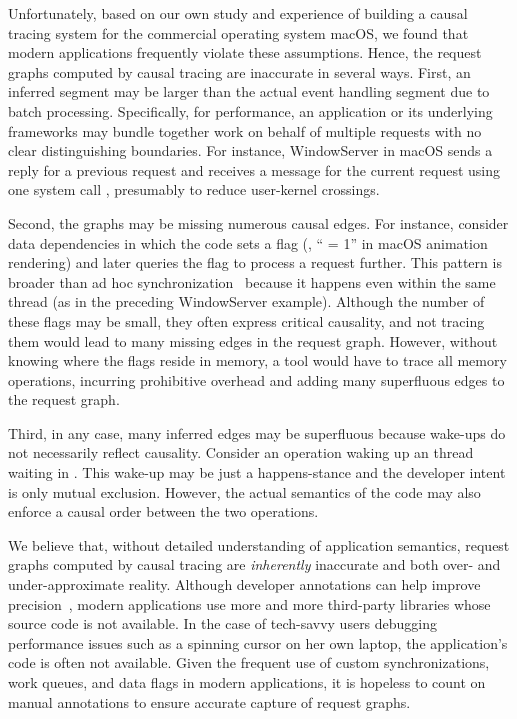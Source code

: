 Unfortunately, based on our own study and experience of building a causal
tracing system for the commercial operating system macOS, we found that modern
applications frequently violate these assumptions. Hence, the request graphs
computed by causal tracing are inaccurate in several ways.  First, an inferred
segment may be larger than the actual event handling segment due to batch
processing.  Specifically, for performance, an application or its underlying
frameworks may bundle together work on behalf of multiple requests with no
clear distinguishing boundaries.  For instance, WindowServer in macOS sends a
reply for a previous request and receives a message for the current request
using one system call , presumably to reduce
user-kernel crossings.

Second, the graphs may be missing numerous causal edges.  For instance,
consider data dependencies in which the code sets a flag (\eg,
`` = 1'' in macOS animation rendering) and later queries
the flag to process a request further.  This pattern is broader than ad
hoc synchronization~\cite{xiong2010ad} because it happens even within the
same thread (as in the preceding WindowServer example).  Although the
number of these flags may be small, they often express
critical causality, and not tracing them would lead to many missing edges in
the request graph.  However, without knowing where the flags reside in memory,
a tool would have to trace all memory operations, incurring prohibitive
overhead and adding many superfluous edges to the request graph.

Third, in any case, many inferred edges may be superfluous because wake-ups do
not necessarily reflect causality.  Consider an  operation waking
up an thread waiting in .  This wake-up may be just a happens-stance
and the developer intent is only mutual exclusion.  However, the actual
semantics of the code may also enforce a causal order between the two
operations.

We believe that, without detailed understanding of application semantics,
request graphs computed by causal tracing are \emph{inherently} inaccurate and
both over- and under-approximate reality.  Although developer annotations can
help improve precision~\cite{barham2004using, reynolds2006pip}, modern
applications use more and more third-party libraries whose source code is not
available.  In the case of tech-savvy users debugging performance issues such
as a spinning cursor on her own laptop, the application's code is
often not available.  Given the frequent use of custom synchronizations, work
queues, and data flags in modern applications, it is hopeless to count on
manual annotations to ensure accurate capture of request graphs.

